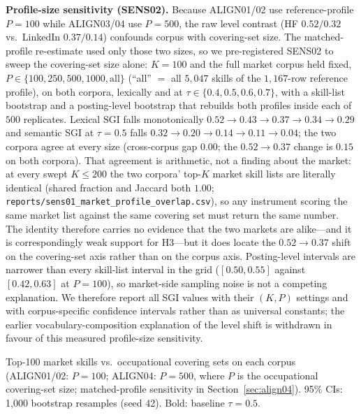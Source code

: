 \documentclass[journal]{IEEEtran}
\begin{document}
\textbf{Profile-size sensitivity (SENS02).} Because ALIGN01/02 use reference-profile $P = 100$ while ALIGN03/04 use $P = 500$, the raw level contrast (HF $0.52/0.32$ vs.\ LinkedIn $0.37/0.14$) confounds corpus with covering-set size. The matched-profile re-estimate used only those two sizes, so we pre-registered SENS02 to sweep the covering-set size alone: $K = 100$ and the full market corpus held fixed, $P \in \{100, 250, 500, 1000, \text{all}\}$ (``all'' $=$ all $5{,}047$ skills of the $1{,}167$-row reference profile), on both corpora, lexically and at $\tau \in \{0.4, 0.5, 0.6, 0.7\}$, with a skill-list bootstrap and a posting-level bootstrap that rebuilds both profiles inside each of $500$ replicates. Lexical SGI falls monotonically $0.52 \rightarrow 0.43 \rightarrow 0.37 \rightarrow 0.34 \rightarrow 0.29$ and semantic SGI at $\tau = 0.5$ falls $0.32 \rightarrow 0.20 \rightarrow 0.14 \rightarrow 0.11 \rightarrow 0.04$; the two corpora agree at every size (cross-corpus gap $0.00$; the $0.52 \rightarrow 0.37$ change is $0.15$ on both corpora). That agreement is arithmetic, not a finding about the market: at every swept $K \le 200$ the two corpora' top-$K$ market skill lists are literally identical (shared fraction and Jaccard both $1.00$; \texttt{reports/sens01\_market\_profile\_overlap.csv}), so any instrument scoring the same market list against the same covering set must return the same number. The identity therefore carries no evidence that the two markets are alike---and it is correspondingly weak support for H3---but it does locate the $0.52 \rightarrow 0.37$ shift on the covering-set axis rather than on the corpus axis. Posting-level intervals are narrower than every skill-list interval in the grid ($[0.50, 0.55]$ against $[0.42, 0.63]$ at $P = 100$), so market-side sampling noise is not a competing explanation. We therefore report all SGI values with their $(K, P)$ settings and with corpus-specific confidence intervals rather than as universal constants; the earlier vocabulary-composition explanation of the level shift is withdrawn in favour of this measured profile-size sensitivity.

\begin{table}[!htbp]
\centering
\caption{Nested-Superset SGI Check (ALIGN01/02 vs.\ ALIGN04)}
\label{tab:crosscorpus}
\resizebox{\columnwidth}{!}{%

}
\par\vspace{3pt}
{\footnotesize Top-100 market skills vs.\ occupational covering sets on each corpus (ALIGN01/02: $P{=}100$; ALIGN04: $P{=}500$, where $P$ is the occupational covering-set size; matched-profile sensitivity in Section~\ref{sec:align04}). 95\% CIs: 1,000 bootstrap resamples (seed 42). Bold: baseline $\tau = 0.5$.}
\end{table}
\end{document}
